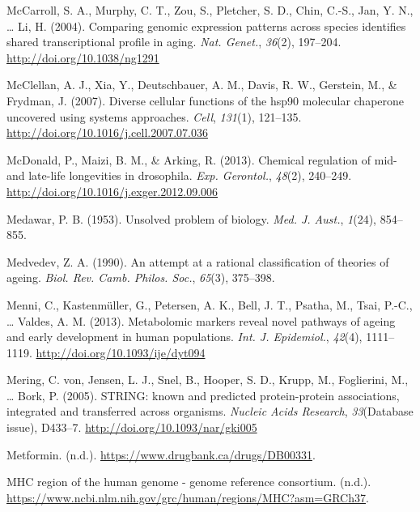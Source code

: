 \documentclass[12pt,twoside]{unicam}
\begin{document}
\begin{cslreferences}
\leavevmode\hypertarget{ref-McCarroll2004}{}%
McCarroll, S. A., Murphy, C. T., Zou, S., Pletcher, S. D., Chin, C.-S., Jan, Y. N., \ldots{} Li, H. (2004). Comparing genomic expression patterns across species identifies shared transcriptional profile in aging. \emph{Nat. Genet.}, \emph{36}(2), 197--204. \url{http://doi.org/10.1038/ng1291}

\leavevmode\hypertarget{ref-McClellan2007}{}%
McClellan, A. J., Xia, Y., Deutschbauer, A. M., Davis, R. W., Gerstein, M., \& Frydman, J. (2007). Diverse cellular functions of the hsp90 molecular chaperone uncovered using systems approaches. \emph{Cell}, \emph{131}(1), 121--135. \url{http://doi.org/10.1016/j.cell.2007.07.036}

\leavevmode\hypertarget{ref-McDonald2013}{}%
McDonald, P., Maizi, B. M., \& Arking, R. (2013). Chemical regulation of mid- and late-life longevities in drosophila. \emph{Exp. Gerontol.}, \emph{48}(2), 240--249. \url{http://doi.org/10.1016/j.exger.2012.09.006}

\leavevmode\hypertarget{ref-Medawar1953}{}%
Medawar, P. B. (1953). Unsolved problem of biology. \emph{Med. J. Aust.}, \emph{1}(24), 854--855.

\leavevmode\hypertarget{ref-Medvedev1990}{}%
Medvedev, Z. A. (1990). An attempt at a rational classification of theories of ageing. \emph{Biol. Rev. Camb. Philos. Soc.}, \emph{65}(3), 375--398.

\leavevmode\hypertarget{ref-Menni2013}{}%
Menni, C., Kastenmüller, G., Petersen, A. K., Bell, J. T., Psatha, M., Tsai, P.-C., \ldots{} Valdes, A. M. (2013). Metabolomic markers reveal novel pathways of ageing and early development in human populations. \emph{Int. J. Epidemiol.}, \emph{42}(4), 1111--1119. \url{http://doi.org/10.1093/ije/dyt094}

\leavevmode\hypertarget{ref-VonMering2005}{}%
Mering, C. von, Jensen, L. J., Snel, B., Hooper, S. D., Krupp, M., Foglierini, M., \ldots{} Bork, P. (2005). STRING: known and predicted protein-protein associations, integrated and transferred across organisms. \emph{Nucleic Acids Research}, \emph{33}(Database issue), D433--7. \url{http://doi.org/10.1093/nar/gki005}

\leavevmode\hypertarget{ref-Metformin}{}%
Metformin. (n.d.). \url{https://www.drugbank.ca/drugs/DB00331}.

\leavevmode\hypertarget{ref-mhc2020}{}%
MHC region of the human genome - genome reference consortium. (n.d.). \url{https://www.ncbi.nlm.nih.gov/grc/human/regions/MHC?asm=GRCh37}.


\end{cslreferences}
\end{document}
